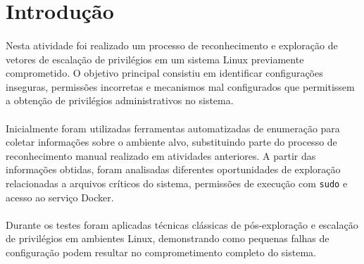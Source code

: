 \section{Introdução}

\paragraph{}
Nesta atividade foi realizado um processo de reconhecimento e exploração de
vetores de escalação de privilégios em um sistema Linux previamente
comprometido. O objetivo principal consistiu em identificar configurações
inseguras, permissões incorretas e mecanismos mal configurados que permitissem
a obtenção de privilégios administrativos no sistema.

\paragraph{}
Inicialmente foram utilizadas ferramentas automatizadas de enumeração para
coletar informações sobre o ambiente alvo, substituindo parte do processo de
reconhecimento manual realizado em atividades anteriores. A partir das
informações obtidas, foram analisadas diferentes oportunidades de exploração
relacionadas a arquivos críticos do sistema, permissões de execução com
\texttt{sudo} e acesso ao serviço Docker.

\paragraph{}
Durante os testes foram aplicadas técnicas clássicas de pós-exploração e
escalação de privilégios em ambientes Linux, demonstrando como pequenas falhas
de configuração podem resultar no comprometimento completo do sistema.
